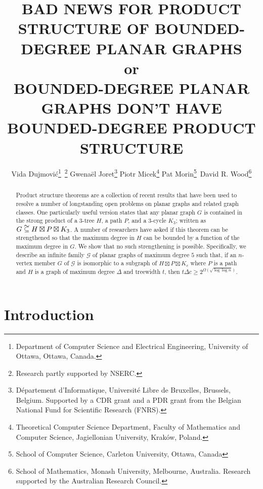 \documentclass{patmorin}
\title{\MakeUppercase{Bad News for Product Structure \newline of Bounded-Degree Planar Graphs} \\ or \\
\MakeUppercase{Bounded-Degree Planar Graphs Don't Have Bounded-Degree Product Structure}}
\author{%
  Vida Dujmović\thanks{Department of Computer Science and Electrical Engineering, University of Ottawa, Ottawa, Canada.}\, \thanks{Research partly supported by NSERC.} \quad
  Gwenaël Joret\thanks{D\'epartement d'Informatique, Universit\'e Libre de Bruxelles, Brussels, Belgium.
  Supported by a CDR grant and a PDR grant from the Belgian National Fund for Scientific Research (FNRS).} \quad
  Piotr Micek\thanks{Theoretical Computer Science Department, Faculty of Mathematics and Computer Science, Jagiellonian University, Krak\'ow, Poland.}\quad
  Pat Morin\thanks{School of Computer Science, Carleton University, Ottawa, Canada}\, \footnotemark[2] \quad
  David R. Wood\thanks{School of Mathematics, Monash University, Melbourne, Australia.
  Research supported by the Australian Research Council.}
}
\date{}
\newcommand\subsetcong{\mathrel{\text{%
    \setbox0\hbox{$\subseteq$}%
    \rlap{\hbox to \wd0{\hss\hss\hss\raisebox{1.5\height}{$\sim$}\hss}}\box0
}}}
\renewcommand{\ge}{\geqslant}
\begin{document}
\maketitle


\begin{abstract}
   Product structure theorems are a collection of recent results that have been used to resolve a number of longstanding open problems on planar graphs and related graph classes.  One particularly useful version states that any planar graph $G$ is contained in the strong product of a $3$-tree $H$, a path $P$, and a $3$-cycle $K_3$; written as $G\subsetcong H\boxtimes P\boxtimes K_3$.  A number of researchers have asked if this theorem can be strengthened so that the maximum degree in $H$ can be bounded by a function of the maximum degree in $G$.  We show that no such strengthening is possible.  Specifically, we describe an infinite family $\mathcal{G}$ of planar graphs of maximum degree $5$ such that, if an $n$-vertex member $G$ of $\mathcal{G}$ is isomorphic to a subgraph of $H\boxtimes P\boxtimes K_c$ where $P$ is a path and $H$ is a graph of maximum degree $\Delta$ and treewidth $t$, then $t\Delta c \ge 2^{\Omega(\sqrt{\log\log n})}$.
\end{abstract}

\section{Introduction}
\end{document}
